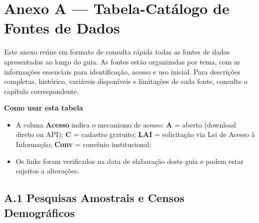 
\chapter*{Anexo A — Tabela-Catálogo de Fontes de Dados}

Este anexo reúne em formato de consulta rápida todas as fontes de dados apresentadas ao longo do guia. As fontes estão organizadas por tema, com as informações essenciais para identificação, acesso e uso inicial. Para descrições completas, histórico, variáveis disponíveis e limitações de cada fonte, consulte o capítulo correspondente.

\medskip

\textbf{Como usar esta tabela}

\begin{itemize}
  \item A coluna \textbf{Acesso} indica o mecanismo de acesso: \textbf{A} = aberto (download direto ou API); \textbf{C} = cadastro gratuito; \textbf{LAI} = solicitação via Lei de Acesso à Informação; \textbf{Conv} = convênio institucional;
  \item Os links foram verificados na data de elaboração deste guia e podem estar sujeitos a alterações.
\end{itemize}

\section*{A.1 Pesquisas Amostrais e Censos Demográficos}

